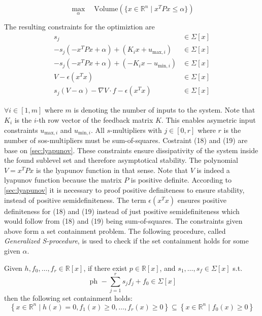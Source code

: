 \documentclass[10pt,a4paper]{article}
\begin{document}
\begin{equation}
\label{eq:sos_problem}
\max\limits_{\alpha} \quad \text{Volume}\left(\{x \in \mathbb{R}^n \mid x^TPx \leq \alpha \}\right)
\end{equation}


The resulting constraints for the optimiztion are
\begin{align}
	s_{j} &\in \Sigma[x]\\
	-s_{j}(-x^TPx + \alpha) + (K_i x + u_{\text{max},i}) &\in \Sigma[x]\\
	-s_{j}(-x^TPx + \alpha) + (-K_i x - u_{\text{min},i}) &\in \Sigma[x]\\
	V - \epsilon (x^Tx) &\in \Sigma[x]\\
	s_j(V-\alpha) - \nabla V \cdot f - \epsilon (x^Tx) &\in \Sigma[x]
\end{align}


$\forall i \in [1,m]$ where $m$ is denoting the number of inputs to the system. Note that $K_i$ is the $i$-th row vector of the feedback matrix $K$. This enables
asymetric input constraints $u_{\text{max},i}$ and $u_{\text{min},i}$. All $s$-multipliers with $j \in [0,r]$ where $r$ is the number of \gls{sos}-multipliers must 
be sum-of-squares. Costraint (18) and (19) are base on \ref{sec:lyapunov}. These constraints ensure dissipativity of the system inside the found sublevel set and
therefore asymptotical stability. The polynomial $V=x^TPx$ is the lyapunov function in that sense. Note that $V$ is indeed a lyapunov function because the matrix 
$P$ is positive definite. According to \ref{sec:lyapunov} it is necessary to proof positive definiteness to ensure stability, instead of
positive semidefiniteness. The term $\epsilon (x^Tx)$ ensures positive definiteness for (18) and (19) instead of just positive semidefiniteness which would follow
from (18) and (19) being sum-of-squares. The constraints given above form a set containment problem. The following procedure, called \textit{Generalized S-procedure},
is used to check if the set containment holds for some given $\alpha$. 

\begin{tcolorbox}[colback=gray!20, colframe=gray!80,title=Generalized S-procedure \cite{cunis_loureiro2023},arc=0.2mm]        
Given $h, f_0, \ldots, f_r \in \mathbb{R}[x]$, if there exist $p \in \mathbb{R}[x]$, and $s_1, \ldots, s_f \in \Sigma[x]$ s.t.
\begin{equation}
	\text { ph }-\sum_{j=1}^r s_j f_j+f_0 \in \Sigma[x]
\end{equation}
then the following set containment holds:
\begin{equation}
	\left\{x \in \mathbb{R}^n \mid h(x)=0, f_1(x) \geq 0, \ldots, f_r(x) \geq 0\right\} \subseteq\left\{x \in \mathbb{R}^n \mid f_0(x) \geq 0\right\}
\end{equation}
\end{tcolorbox}
\end{document}
